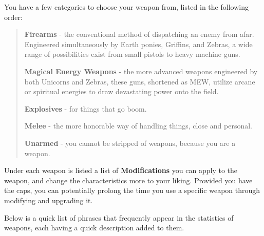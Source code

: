\documentclass[11pt,a4paper,twocolumn]{book}
\begin{document}
	You have a few categories to choose your weapon from, listed in the following order:
	
	\begin{verse}
		\textbf{Firearms} - the conventional method of dispatching an enemy from afar. Engineered simultaneously by Earth ponies, Griffins, and Zebras, a wide range of possibilities exist from small pistols to heavy machine guns.
		
		\textbf{Magical Energy Weapons} - the more advanced weapons engineered by both Unicorns and Zebras, these guns, shortened as MEW, utilize arcane or spiritual energies to draw devastating power onto the field.
		
		\textbf{Explosives} - for things that go boom.
		
		\textbf{Melee} - the more honorable way of handling things, close and personal.
		
		\textbf{Unarmed} - you cannot be stripped of weapons, because you are a weapon.
	\end{verse}
	
	Under each weapon is listed a list of \textbf{Modifications} you can apply to the weapon, and change the characteristics more to your liking. Provided you have the caps, you can potentially prolong the time you use a specific weapon through modifying and upgrading it.
	
	Below is a quick list of phrases that frequently appear in the statistics of weapons, each having a quick description added to them.
	
\end{document}
